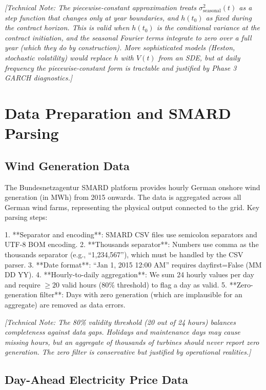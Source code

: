 \documentclass[11pt, a4paper, twoside]{article}
\begin{document}
\textit{[Technical Note: The piecewise-constant approximation treats $\sigma^2_{\text{seasonal}}(t)$ as a step function that changes only at year boundaries, and $h(t_0)$ as fixed during the contract horizon. This is valid when $h(t_0)$ is the conditional variance at the contract initiation, and the seasonal Fourier terms integrate to zero over a full year (which they do by construction). More sophisticated models (Heston, stochastic volatility) would replace $h$ with $V(t)$ from an SDE, but at daily frequency the piecewise-constant form is tractable and justified by Phase 3 GARCH diagnostics.]}

\section{Data Preparation and SMARD Parsing}

\subsection{Wind Generation Data}

The Bundesnetzagentur SMARD platform provides hourly German onshore wind generation (in MWh) from 2015 onwards. The data is aggregated across all German wind farms, representing the physical output connected to the grid. Key parsing steps:

1. **Separator and encoding**: SMARD CSV files use semicolon separators and UTF-8 BOM encoding.
2. **Thousands separator**: Numbers use comma as the thousands separator (e.g., ``1,234,567''), which must be handled by the CSV parser.
3. **Date format**: ``Jan 1, 2015 12:00 AM'' requires dayfirst=False (MM DD YY).
4. **Hourly-to-daily aggregation**: We sum 24 hourly values per day and require $\geq 20$ valid hours (80\% threshold) to flag a day as valid.
5. **Zero-generation filter**: Days with zero generation (which are implausible for an aggregate) are removed as data errors.

\textit{[Technical Note: The 80\% validity threshold (20 out of 24 hours) balances completeness against data gaps. Holidays and maintenance days may cause missing hours, but an aggregate of thousands of turbines should never report zero generation. The zero filter is conservative but justified by operational realities.]}

\subsection{Day-Ahead Electricity Price Data}
\end{document}
